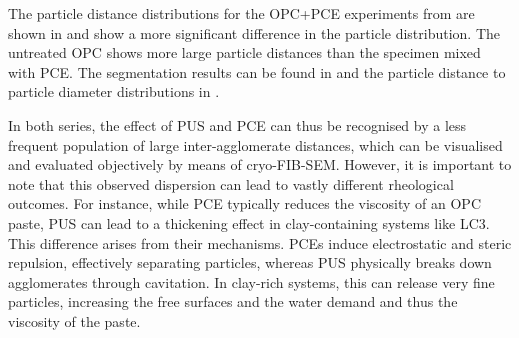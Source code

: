 The particle distance distributions for the \ac{OPC}+\ac{PCE} experiments from \textcite{zingg.2008a} are shown in  and show a more significant difference in the particle distribution.
The untreated \ac{OPC} shows more large particle distances than the specimen mixed with \ac{PCE}.
The segmentation results can be found in  and the particle distance to particle diameter distributions in .

In both series, the effect of \ac{PUS} and \ac{PCE} can thus be recognised by a less frequent population of large inter-agglomerate distances, which can be visualised and evaluated objectively by means of cryo-\ac{FIB}-\ac{SEM}.
However, it is important to note that this observed dispersion can lead to vastly different rheological outcomes.
For instance, while \ac{PCE} typically reduces the viscosity of an \ac{OPC} paste, \ac{PUS} can lead to a thickening effect in clay-containing systems like \ac{LC3}.
This difference arises from their mechanisms.
\ac{PCE}s induce electrostatic and steric repulsion, effectively separating particles, whereas \ac{PUS} physically breaks down agglomerates through cavitation.
In clay-rich systems, this can release very fine particles, increasing the free surfaces and the water demand and thus the viscosity of the paste.

